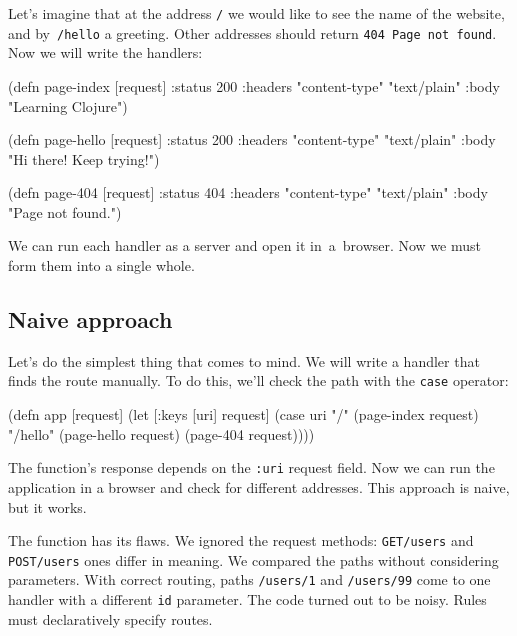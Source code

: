 
Let's imagine that at the address \verb|/| we would like to see the name of the website, and by~\verb|/hello| a greeting. Other addresses should return \verb|404 Page not found|. Now we will write the handlers:

\begin{english}
  \begin{clojure}
(defn page-index [request]
  {:status 200
   :headers {"content-type" "text/plain"}
   :body "Learning Clojure"})

(defn page-hello [request]
  {:status 200
   :headers {"content-type" "text/plain"}
   :body "Hi there! Keep trying!"})

(defn page-404 [request]
  {:status 404
   :headers {"content-type" "text/plain"}
   :body "Page not found."})
  \end{clojure}
\end{english}

We can run each handler as a server and open it in~a~browser. Now we must form them into a single whole.

\subsection{Naive approach}

Let's do the simplest thing that comes to mind. We will write a handler that finds the route manually. To do this, we'll check the path with the \verb|case| operator:

\begin{english}
  \begin{clojure}
(defn app [request]
  (let [{:keys [uri]} request]
    (case uri
      "/"      (page-index request)
      "/hello" (page-hello request)
      (page-404 request))))
  \end{clojure}
\end{english}

The function's response depends on the \verb|:uri| request field. Now we can run the application in a browser and check for different addresses. This approach is naive, but it works.

The function has its flaws. We ignored the request methods: \verb|GET/users| and \verb|POST/users| ones differ in meaning. We compared the paths without considering parameters. With correct routing, paths \verb|/users/1| and \verb|/users/99| come to one handler with a different \verb|id| parameter. The code turned out to be noisy. Rules must declaratively specify routes.

